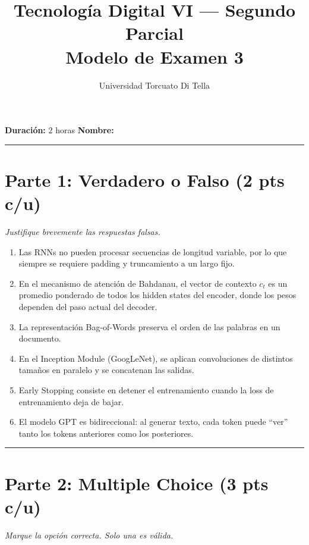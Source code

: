 \documentclass[12pt,a4paper]{article}
\title{\textbf{Tecnología Digital VI --- Segundo Parcial} \\ Modelo de Examen 3}
\author{Universidad Torcuato Di Tella}
\date{}
\begin{document}
\maketitle
\noindent\textbf{Duración:} 2 horas \hfill \textbf{Nombre:} \hrulefill

\vspace{0.5cm}
\hrule
\vspace{0.5cm}

\section*{Parte 1: Verdadero o Falso (2 pts c/u)}
\textit{Justifique brevemente las respuestas falsas.}

\begin{enumerate}[label=\alph*)]
    \item Las RNNs no pueden procesar secuencias de longitud variable, por lo que siempre se requiere padding y truncamiento a un largo fijo.

    \item En el mecanismo de atención de Bahdanau, el vector de contexto $c_t$ es un promedio ponderado de todos los hidden states del encoder, donde los pesos dependen del paso actual del decoder.

    \item La representación Bag-of-Words preserva el orden de las palabras en un documento.

    \item En el Inception Module (GoogLeNet), se aplican convoluciones de distintos tamaños en paralelo y se concatenan las salidas.

    \item Early Stopping consiste en detener el entrenamiento cuando la loss de entrenamiento deja de bajar.

    \item El modelo GPT es bidireccional: al generar texto, cada token puede ``ver'' tanto los tokens anteriores como los posteriores.
\end{enumerate}

\vspace{0.5cm}
\hrule
\vspace{0.5cm}

\section*{Parte 2: Multiple Choice (3 pts c/u)}
\textit{Marque la opción correcta. Solo una es válida.}
\end{document}
